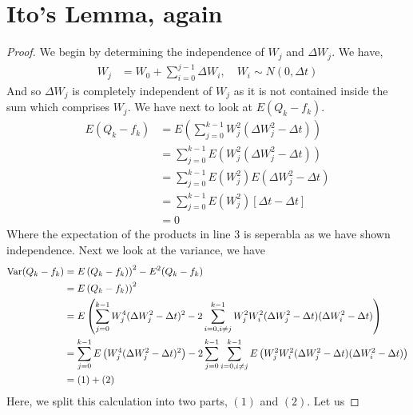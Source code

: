 \documentclass{article}
\begin{document}
\section{Ito's Lemma, again}
    \begin{proof}
        We begin by determining the independence of $W_j$ and $\Delta W_j$. We
        have, 
        \begin{align*}
            W_j &= W_0 + \sum_{i=0}^{j-1} \Delta W_i, \quad W_i \sim N(0,\Delta t)
        \end{align*}
        And so $\Delta W_j$ is completely independent of $W_j$ as it is not
        contained inside the sum which comprises $W_j$. 
        We have next to look at $E(Q_k - f_k)$. 
        \begin{align*}
            E(Q_k - f_k) &= E\left(\sum_{j=0}^{k-1} W_j^2\left(\Delta W_j^2 - \Delta
            t\right)\right)
            \\
            &= \sum_{j=0}^{k-1} E\left(W_j^2\left(\Delta W_j^2 - \Delta
            t\right)\right)
            \\
            &= \sum_{j=0}^{k-1} E(W_j^2)E\left(\Delta W_j^2 - \Delta
            t\right)
            \\
            &= \sum_{j=0}^{k-1} E(W_j^2)\left[\Delta t - \Delta t\right]
            \\
            &= 0
        \end{align*}
        Where the expectation of the products in line 3 is seperabla as we have
        shown independence. Next we look at the variance, we have
        \begin{align*}
            \text{Var}(Q_k - f_k) &= E\left(Q_k-f_k)\right)^2 - E^2(Q_k-f_k)
            \\
            &= E\left(Q_k-f_k)\right)^2
            \\
            &= E\left(\sum_{j=0}^{k-1}W_j^4(\Delta W_j^2 - \Delta t)^2 -
            2\sum_{i=0,i\ne j}^{k-1}W_j^2W_i^2(\Delta W_j^2 - \Delta t)(\Delta
            W_i^2 - \Delta t)\right)
            \\
            &= \sum_{j=0}^{k-1}E\left(W_j^4(\Delta W_j^2 - \Delta t)^2\right) -
            2\sum_{j=0}^{k-1}\sum_{i=0,i\ne j}^{k-1}E\left(W_j^2W_i^2(\Delta W_j^2 - \Delta t)(\Delta
            W_i^2 - \Delta t)\right)
            \\
            &= \left(1\right) + \left(2\right)
        \end{align*}
        Here, we split this calculation into two parts, $(1)$ and $(2)$. Let us

\end{proof}
\end{document}
